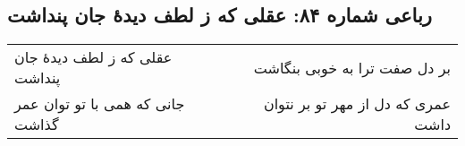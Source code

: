 \begin{center}
\section*{رباعی شماره ۸۴: عقلی که ز لطف دیدهٔ جان پنداشت}
\label{sec:sh084}
\begin{longtable}{l p{0.5cm} r}
عقلی که ز لطف دیدهٔ جان پنداشت
&&
بر دل صفت ترا به خوبی بنگاشت
\\
جانی که همی با تو توان عمر گذاشت
&&
عمری که دل از مهر تو بر نتوان داشت
\\
\end{longtable}
\end{center}
